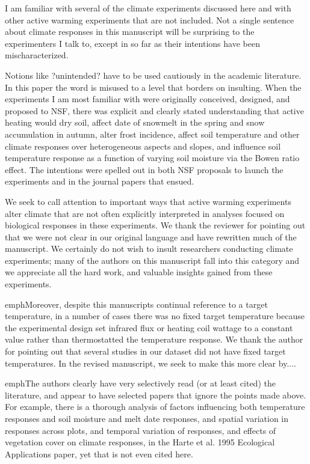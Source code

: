 \documentclass[11pt,a4paper]{letter}
\begin{document}
\begin{letter}{}
{I am familiar with several of the climate experiments discussed here and with other active warming experiments that are not included.  Not a single sentence about climate responses in this manuscript will be surprising to the experimenters I talk to, except in so far as their intentions have been mischaracterized.  

Notions like ?unintended? have to be used cautiously in the academic literature.  In this paper the word is misused to a level that borders on insulting.  When the experiments I am most familiar with were originally conceived, designed, and proposed to NSF, there was explicit and clearly stated understanding that active heating would dry soil, affect date of snowmelt in the spring and snow accumulation in autumn, alter frost incidence, affect soil temperature and other climate responses over heterogeneous aspects and slopes, and influence soil temperature response as a function of varying soil moisture via the Bowen ratio effect.  The intentions were spelled out in both NSF proposals to launch the experiments and in the journal papers that ensued.}

We seek to call attention to important ways that active warming experiments alter climate that are not often explicitly interpreted in analyses focused on biological responses in these experiments. We thank the reviewer for pointing out that we were not clear in our original language and have rewritten much of the manuscript. We certainly do not wish to insult researchers conducting climate experiments; many of the authors on this manuscript fall into this category and we appreciate all the hard work, and valuable insights gained from these experiments.

emph{Moreover, despite this manuscripts continual reference to a target temperature, in a number of cases there  was no fixed target temperature because the experimental design set infrared flux or heating coil wattage to a constant value rather than thermostatted the temperature response.}
We thank the author for pointing out that several studies in our dataset did not have fixed target temperatures. In the revised manuscript, we seek to make this more clear by....   

emph{The authors clearly have very selectively read (or at least cited) the literature,  and appear to have selected papers that ignore the points made above.  For example, there is a  thorough analysis of factors influencing both temperature responses and soil moisture and melt date responses, and spatial variation in responses across plots,  and temporal variation of responses, and effects of vegetation cover on climate responses, in the Harte et al. 1995 Ecological Applications paper, yet that is not even cited here.}


\end{letter}
\end{document}

